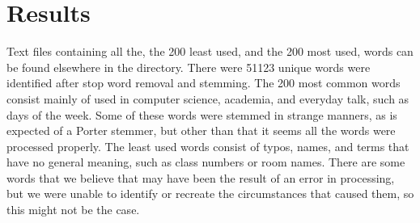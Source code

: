 \documentclass[12pt]{article}
\begin{document}
\section{Results}
Text files containing all the, the 200 least used, and the 200 most used, words can be found elsewhere in the directory. There were 51123 unique words were identified after stop word removal and stemming. The 200 most common words consist mainly of used in computer science, academia, and everyday talk, such as days of the week. Some of these words were stemmed in strange manners, as is expected of a Porter stemmer, but other than that it seems all the words were processed properly. The least used words consist of typos, names, and terms that have no general meaning, such as class numbers or room names. There are some words that we believe that may have been the result of an error in processing, but we were unable to identify or recreate the circumstances that caused them, so this might not be the case.

\begin{thebibliography}{9}


\end{thebibliography}
\end{document}
